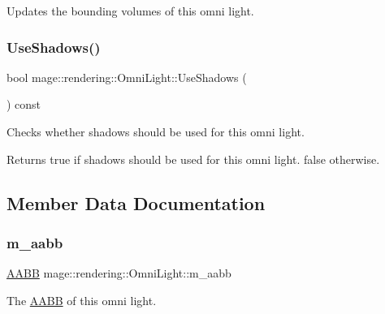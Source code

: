Updates the bounding volumes of this omni light. \hypertarget{classmage_1_1rendering_1_1_omni_light_a7b4bd4cdd980feb3d841fff5947720e9}{}\label{classmage_1_1rendering_1_1_omni_light_a7b4bd4cdd980feb3d841fff5947720e9} 
\subsubsection{\texorpdfstring{Use\+Shadows()}{UseShadows()}}
{\footnotesize\ttfamily bool mage\+::rendering\+::\+Omni\+Light\+::\+Use\+Shadows (\begin{DoxyParamCaption}{ }\end{DoxyParamCaption}) const\hspace{0.3cm}{\ttfamily [noexcept]}}

Checks whether shadows should be used for this omni light.

\begin{DoxyReturn}{Returns}
{\ttfamily true} if shadows should be used for this omni light. {\ttfamily false} otherwise. 
\end{DoxyReturn}


\subsection{Member Data Documentation}
\hypertarget{classmage_1_1rendering_1_1_omni_light_ac2b5bb2e28364445c7bce70c8fa1374e}{}\label{classmage_1_1rendering_1_1_omni_light_ac2b5bb2e28364445c7bce70c8fa1374e} 
\subsubsection{\texorpdfstring{m\+\_\+aabb}{m\_aabb}}
{\footnotesize\ttfamily \hyperlink{classmage_1_1_a_a_b_b}{A\+A\+BB} mage\+::rendering\+::\+Omni\+Light\+::m\+\_\+aabb\hspace{0.3cm}{\ttfamily [private]}}

The \hyperlink{classmage_1_1_a_a_b_b}{A\+A\+BB} of this omni light. \hypertarget{classmage_1_1rendering_1_1_omni_light_ac5aca97b5729d9c0856ed08f64976edf}{}\label{classmage_1_1rendering_1_1_omni_light_ac5aca97b5729d9c0856ed08f64976edf} 
